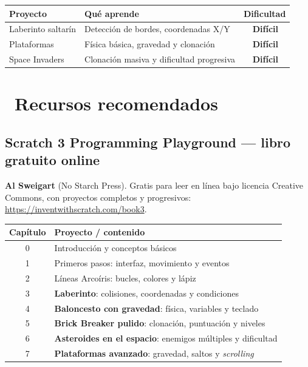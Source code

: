 \documentclass[11pt,a4paper]{article}
\newcommand{\iconotexto}[2]{\textcolor{cyanNeon}{\faIcon{#1}}~#2}
\newcommand{\dificil}{\textcolor{rojoAlerta}{\faIcon{circle}\,\textbf{Difícil}}}
\begin{document}
\begin{center}
\renewcommand{\arraystretch}{1.3}
\begin{tabularx}{\linewidth}{l X c}
\toprule
\textbf{Proyecto} & \textbf{Qué aprende} & \textbf{Dificultad} \\
\midrule
Laberinto saltarín       & Detección de bordes, coordenadas X/Y             & \dificil \\
Plataformas              & Física básica, gravedad y clonación              & \dificil \\
Space Invaders           & Clonación masiva y dificultad progresiva         & \dificil \\
\bottomrule
\end{tabularx}
\end{center}

\section{\iconotexto{book}{Recursos recomendados}}

\subsection{Scratch 3 Programming Playground — libro gratuito online}

\textbf{Al Sweigart} (No Starch Press). Gratis para leer en línea bajo licencia
Creative Commons, con proyectos completos y progresivos:
\url{https://inventwithscratch.com/book3}.

\begin{center}
\renewcommand{\arraystretch}{1.3}
\begin{tabularx}{\linewidth}{c X}
\toprule
\textbf{Capítulo} & \textbf{Proyecto / contenido} \\
\midrule
0 & Introducción y conceptos básicos \\
1 & Primeros pasos: interfaz, movimiento y eventos \\
2 & Líneas Arcoíris: bucles, colores y lápiz \\
3 & \textbf{Laberinto}: colisiones, coordenadas y condiciones \\
4 & \textbf{Baloncesto con gravedad}: física, variables y teclado \\
5 & \textbf{Brick Breaker pulido}: clonación, puntuación y niveles \\
6 & \textbf{Asteroides en el espacio}: enemigos múltiples y dificultad \\
7 & \textbf{Plataformas avanzado}: gravedad, saltos y \textit{scrolling} \\
\bottomrule
\end{tabularx}
\end{center}
\end{document}
